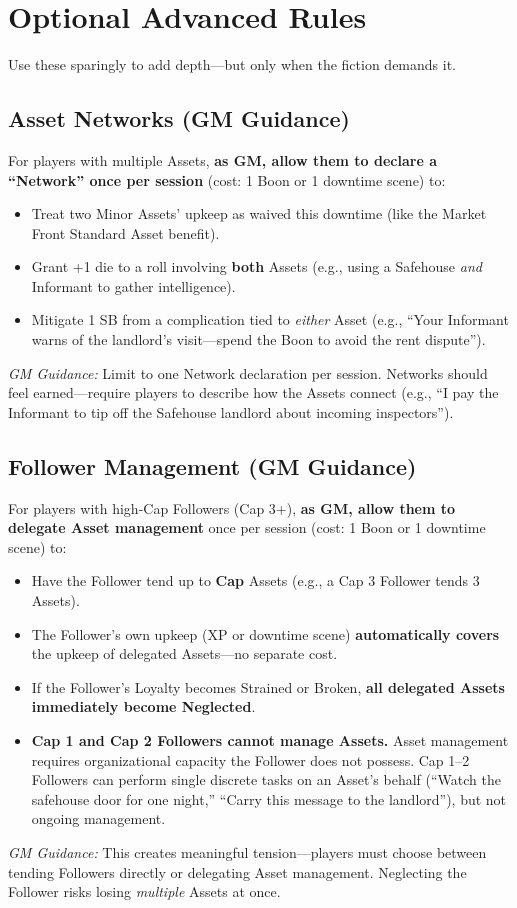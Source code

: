 \section{Optional Advanced Rules}
\label{sec:advanced-rules}
Use these sparingly to add depth---but only when the fiction demands it.  

\subsection{Asset Networks (GM Guidance)}
\label{sec:asset-networks}
For players with multiple Assets, \textbf{as GM, allow them to declare a ``Network'' once per session} (cost: 1 Boon or 1 downtime scene) to:  
\begin{itemize}
  \item Treat two Minor Assets' upkeep as waived this downtime (like the Market Front Standard Asset benefit).  
  \item Grant +1 die to a roll involving \textbf{both} Assets (e.g., using a Safehouse \emph{and} Informant to gather intelligence).  
  \item Mitigate 1 SB from a complication tied to \textit{either} Asset (e.g., ``Your Informant warns of the landlord's visit---spend the Boon to avoid the rent dispute'').  
\end{itemize}
\textit{GM Guidance:} Limit to one Network declaration per session. Networks should feel earned---require players to describe how the Assets connect (e.g., ``I pay the Informant to tip off the Safehouse landlord about incoming inspectors'').

\subsection{Follower Management (GM Guidance)}
\label{sec:follower-management}
For players with high-Cap Followers (Cap 3+), \textbf{as GM, allow them to delegate Asset management} once per session (cost: 1 Boon or 1 downtime scene) to:  
\begin{itemize}
  \item Have the Follower tend up to \textbf{Cap} Assets (e.g., a Cap 3 Follower tends 3 Assets).  
  \item The Follower's own upkeep (XP or downtime scene) \textbf{automatically covers} the upkeep of delegated Assets---no separate cost.  
  \item If the Follower's Loyalty becomes Strained or Broken, \textbf{all delegated Assets immediately become Neglected}.  
  \item \textbf{Cap 1 and Cap 2 Followers cannot manage Assets.} Asset management requires organizational capacity the Follower does not possess. Cap 1--2 Followers can perform single discrete tasks on an Asset's behalf (``Watch the safehouse door for one night,'' ``Carry this message to the landlord''), but not ongoing management.  
\end{itemize}
\textit{GM Guidance:} This creates meaningful tension---players must choose between tending Followers directly or delegating Asset management. Neglecting the Follower risks losing \textit{multiple} Assets at once.

